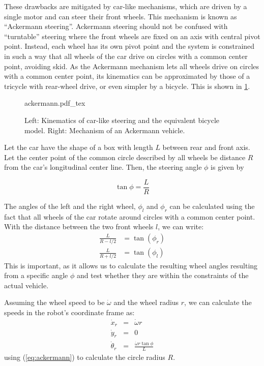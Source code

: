 These drawbacks are mitigated by car-like mechanisms, which are driven by a single motor and can steer their front wheels. This mechanism is known as ``Ackermann steering''. 
Ackermann steering should not be confused with ``turntable'' steering  where the front wheels are fixed on an axis with central pivot point.
Instead, each wheel has its own pivot point and the system is constrained in such a way that all wheels of the car drive on circles with a common center point, avoiding skid.
As the Ackermann mechanism lets all wheels drive on circles with a common center point, its kinematics can be approximated by those of a tricycle with rear-wheel drive, or even simpler by a bicycle. This is shown in \cref{fig:ackermann}.

\begin{figure}[htb!]
    \centering
    \def\svgwidth{0.9\textwidth}
    {ackermann.pdf_tex}
    \caption{Left: Kinematics of car-like steering and the equivalent bicycle model. Right: Mechanism of an Ackermann vehicle.}
    \label{fig:ackermann}
\end{figure}

Let the car have the shape of a box with length $L$ between rear and front axis. Let the center point of the common circle described by all wheels be distance $ R$ from the car's longitudinal center line. Then, the steering angle $ \phi$ is given by

\begin{equation}\label{eq:ackermann}
\tan \phi = \frac{L}{R}
\end{equation}

The angles of the left and the right wheel, $ \phi_l$ and $ \phi_r$ can be calculated using the fact that all wheels of the car rotate around circles with a common center point. With the distance between the two front wheels $l$, we can write:
\begin{eqnarray}
\frac{L}{R-l/2}&=\tan{(\phi_r)} \nonumber \\
\frac{L}{R+l/2}&=\tan{(\phi_l)}
\end{eqnarray}
This is important, as it allows us to calculate the resulting wheel angles resulting from a specific angle $\phi$ and test whether they are within the constraints of the actual vehicle.

Assuming the wheel speed to be $\dot{\omega}$ and the wheel radius $r$, we can calculate the speeds in the robot's coordinate frame as:
\begin{eqnarray}
\dot{x}_r&=&\dot{\omega}r \nonumber \\
\dot{y}_r&=&0\\
\dot{\theta}_r&=&\frac{\dot{\omega}r\tan\phi}{L} \nonumber
\end{eqnarray}
using (\ref{eq:ackermann}) to calculate the circle radius $R$.


